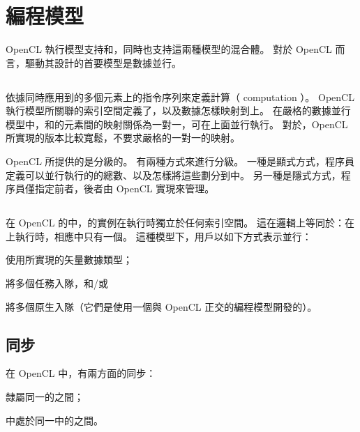 \section{編程模型}
OpenCL 執行模型支持和，同時也支持這兩種模型的混合體。
對於 OpenCL 而言，驅動其設計的首要模型是數據並行。

\startbuffer[sectitledppm]
\stopbuffer
\subsection{\getbuffer[sectitledppm]}

依據同時應用到的多個元素上的指令序列來定義計算（ computation ）。
OpenCL 執行模型所關聯的索引空間定義了，以及數據怎樣映射到上。
在嚴格的數據並行模型中，和的元素間的映射關係為一對一，可在上面並行執行。
對於，OpenCL 所實現的版本比較寬鬆，不要求嚴格的一對一的映射。

OpenCL 所提供的是分級的。
有兩種方式來進行分級。
一種是顯式方式，程序員定義可以並行執行的的總數、以及怎樣將這些劃分到中。
另一種是隱式方式，程序員僅指定前者，後者由 OpenCL 實現來管理。

\startbuffer[sectitletppm]
\stopbuffer
\subsection{\getbuffer[sectitletppm]}
在 OpenCL 的中，的實例在執行時獨立於任何索引空間。
這在邏輯上等同於：在上執行時，相應中只有一個。
這種模型下，用戶以如下方式表示並行：

\startigBase
\item 使用所實現的矢量數據類型；
\item 將多個任務入隊，和/或
\item 將多個原生入隊（它們是使用一個與 OpenCL 正交的編程模型開發的）。
\stopigBase

\subsection{同步}
在 OpenCL 中，有兩方面的同步：
\startigBase
\item 隸屬同一的之間；
\item {}中處於同一中的之間。
\stopigBase

